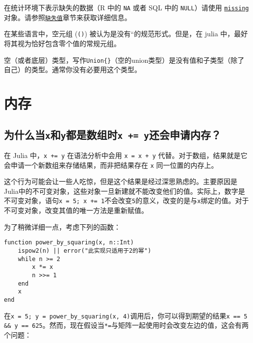 在统计环境下表示缺失的数据（R 中的 \texttt{NA} 或者 SQL 中的 \texttt{NULL}）请使用 \hyperlink{14596725676261444434}{\texttt{missing}} 对象。请参照\hyperlink{5842114294087241506}{\texttt{缺失值}}章节来获取详细信息。



在某些语言中，空元组 (\texttt{()}) 被认为是{\textquotedbl}没有“的规范形式。但是，在 julia 中，最好将其视为恰好包含零个值的常规元组。



空（或者{\textquotedbl}底层{\textquotedbl}）类型，写作\texttt{Union\{\}}（空的union类型）是没有值和子类型（除了自己）的类型。通常你没有必要用这个类型。



\hypertarget{12500994751877938228}{}


\section{内存}



\hypertarget{2527646600001256276}{}


\subsection{为什么当\texttt{x}和\texttt{y}都是数组时\texttt{x += y}还会申请内存？}



在 Julia 中，\texttt{x += y} 在语法分析中会用 \texttt{x = x + y} 代替。对于数组，结果就是它会申请一个新数组来存储结果，而非把结果存在 \texttt{x} 同一位置的内存上。



这个行为可能会让一些人吃惊，但是这个结果是经过深思熟虑的。主要原因是Julia中的不可变对象，这些对象一旦新建就不能改变他们的值。实际上，数字是不可变对象，语句\texttt{x = 5; x += 1}不会改变\texttt{5}的意义，改变的是与\texttt{x}绑定的值。对于不可变对象，改变其值的唯一方法是重新赋值。



为了稍微详细一点，考虑下列的函数：




\begin{verbatim}
function power_by_squaring(x, n::Int)
    ispow2(n) || error("此实现只适用于2的幂")
    while n >= 2
        x *= x
        n >>= 1
    end
    x
end
\end{verbatim}



在\texttt{x = 5; y = power\_by\_squaring(x, 4)}调用后，你可以得到期望的结果\texttt{x == 5 \&\& y == 625}。然而，现在假设当\texttt{*=}与矩阵一起使用时会改变左边的值，这会有两个问题：



